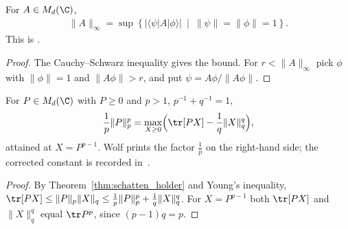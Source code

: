 \begin{theorem}
    \label{thm:operator_norm_variational}
    \leanok
    For $A\in M_d(\C)$,
    \begin{align*}
        \|A\|_\infty=\sup\left\{\bigl|\langle\psi|A|\phi\rangle\bigr|\ \middle|\
        \|\psi\|=\|\phi\|=1\right\}.
    \end{align*}
    This is \cite[Eq.~(8.12)]{Wolf2012Quantum}.
\end{theorem}
\begin{proof}\leanok
    The Cauchy--Schwarz inequality gives the bound. For $r<\|A\|_\infty$ pick
    $\phi$ with $\|\phi\|=1$ and $\|A\phi\|>r$, and put $\psi=A\phi/\|A\phi\|$.
\end{proof}

\begin{theorem}
    \label{thm:positive_schatten_variational}
    \leanok
    For $P\in M_d(\C)$ with $P\ge0$ and $p>1$, $p^{-1}+q^{-1}=1$,
    \begin{align*}
        \frac1p\|P\|_p^p=\max_{X\ge0}\Bigl(\tr[PX]-\frac1q\|X\|_q^q\Bigr),
    \end{align*}
    attained at $X=P^{p-1}$. Wolf \cite[Eq.~(8.13)]{Wolf2012Quantum} prints the
    factor $\frac1p$ on the right-hand side; the corrected constant is recorded
    in~\cite{gap:wolf_ch8_variational_pnorm_constant}.
\end{theorem}
\begin{proof}\leanok
    By Theorem~\ref{thm:schatten_holder} and Young's inequality,
    $\tr[PX]\le\|P\|_p\|X\|_q\le\frac1p\|P\|_p^p+\frac1q\|X\|_q^q$. For
    $X=P^{p-1}$ both $\tr[PX]$ and $\|X\|_q^q$ equal $\tr P^p$, since
    $(p-1)q=p$.
\end{proof}
